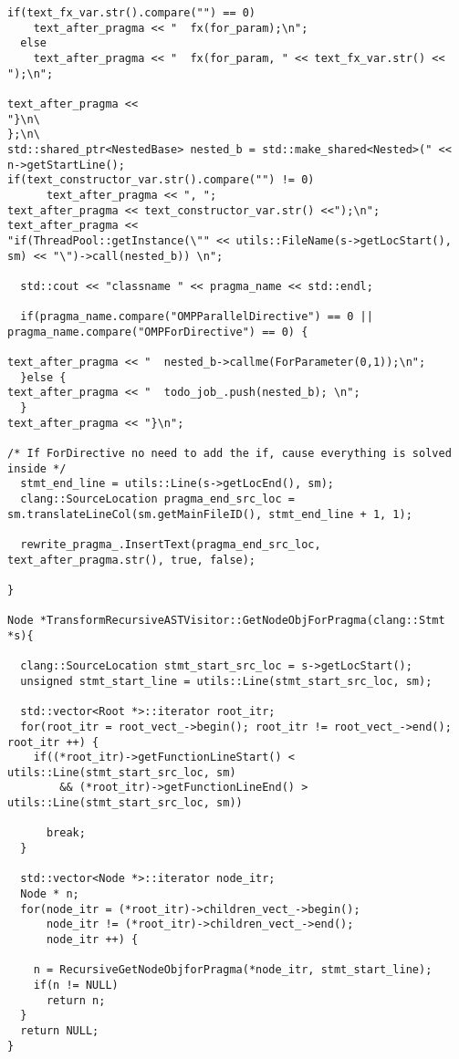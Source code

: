 \documentclass[a4paper,10pt,twoside]{book}
\begin{document}
\begin{lstlisting}[language=CCC, caption=driver/program.cpp]
  if(text_fx_var.str().compare("") == 0)
    text_after_pragma << "  fx(for_param);\n";
  else
    text_after_pragma << "  fx(for_param, " << text_fx_var.str() << ");\n";

text_after_pragma << 
"}\n\
};\n\
std::shared_ptr<NestedBase> nested_b = std::make_shared<Nested>(" << n->getStartLine();
if(text_constructor_var.str().compare("") != 0)
      text_after_pragma << ", ";    
text_after_pragma << text_constructor_var.str() <<");\n";
text_after_pragma << 
"if(ThreadPool::getInstance(\"" << utils::FileName(s->getLocStart(), sm) << "\")->call(nested_b)) \n";
    
  std::cout << "classname " << pragma_name << std::endl;

  if(pragma_name.compare("OMPParallelDirective") == 0 || pragma_name.compare("OMPForDirective") == 0) {

text_after_pragma << "  nested_b->callme(ForParameter(0,1));\n";
  }else {
text_after_pragma << "  todo_job_.push(nested_b); \n";
  }
text_after_pragma << "}\n";

/* If ForDirective no need to add the if, cause everything is solved inside */
  stmt_end_line = utils::Line(s->getLocEnd(), sm);
  clang::SourceLocation pragma_end_src_loc = sm.translateLineCol(sm.getMainFileID(), stmt_end_line + 1, 1);

  rewrite_pragma_.InsertText(pragma_end_src_loc, text_after_pragma.str(), true, false);

}

Node *TransformRecursiveASTVisitor::GetNodeObjForPragma(clang::Stmt *s){

  clang::SourceLocation stmt_start_src_loc = s->getLocStart();
  unsigned stmt_start_line = utils::Line(stmt_start_src_loc, sm);

  std::vector<Root *>::iterator root_itr;
  for(root_itr = root_vect_->begin(); root_itr != root_vect_->end(); root_itr ++) {
    if((*root_itr)->getFunctionLineStart() < utils::Line(stmt_start_src_loc, sm) 
        && (*root_itr)->getFunctionLineEnd() > utils::Line(stmt_start_src_loc, sm))
      
      break;
  }
  
  std::vector<Node *>::iterator node_itr;
  Node * n;
  for(node_itr = (*root_itr)->children_vect_->begin(); 
      node_itr != (*root_itr)->children_vect_->end(); 
      node_itr ++) {
    
    n = RecursiveGetNodeObjforPragma(*node_itr, stmt_start_line);
    if(n != NULL)
      return n;
  }
  return NULL;
}


\end{lstlisting}
\end{document}
